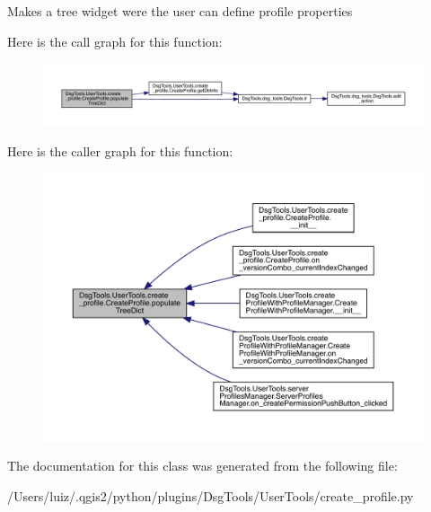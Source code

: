 \begin{DoxyVerb}Makes a tree widget were the user can define profile properties
\end{DoxyVerb}
 Here is the call graph for this function\+:
\nopagebreak
\begin{figure}[H]
\begin{center}
\leavevmode
\includegraphics[width=350pt]{class_dsg_tools_1_1_user_tools_1_1create__profile_1_1_create_profile_aa323abead8349dc6a55e95f88358c7fc_cgraph}
\end{center}
\end{figure}
Here is the caller graph for this function\+:
\nopagebreak
\begin{figure}[H]
\begin{center}
\leavevmode
\includegraphics[width=350pt]{class_dsg_tools_1_1_user_tools_1_1create__profile_1_1_create_profile_aa323abead8349dc6a55e95f88358c7fc_icgraph}
\end{center}
\end{figure}


The documentation for this class was generated from the following file\+:\begin{DoxyCompactItemize}
\item 
/\+Users/luiz/.\+qgis2/python/plugins/\+Dsg\+Tools/\+User\+Tools/create\+\_\+profile.\+py\end{DoxyCompactItemize}
